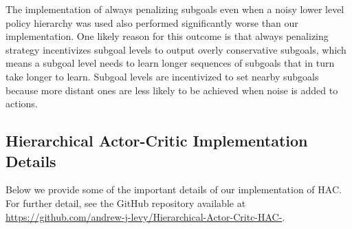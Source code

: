\documentclass{article} %
\begin{document}
The implementation of always penalizing subgoals even when a noisy lower level policy hierarchy was used also performed significantly worse than our implementation.  One likely reason for this outcome is that always penalizing strategy incentivizes subgoal levels to output overly conservative subgoals, which means a subgoal level needs to learn longer sequences of subgoals that in turn take longer to learn.  Subgoal levels are incentivized to set nearby subgoals because more distant ones are less likely to be achieved when noise is added to actions.  

\subsection{Hierarchical Actor-Critic Implementation Details}\label{HAC_deets}
Below we provide some of the important details of our implementation of HAC.  For further detail, see the GitHub repository available at \url{https://github.com/andrew-j-levy/Hierarchical-Actor-Critc-HAC-}.
\end{document}
